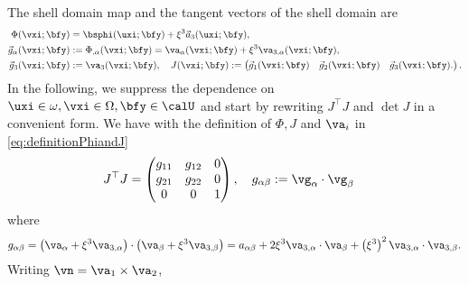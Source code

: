 The shell domain map and the tangent vectors of the shell domain are
 \begin{align}\label{eq:definitionPhiandJ}
     \Phi (\vxi ; \bfy) &= \bsphi(\uxi; \bfy)  + \xi^3 \vec a_3(\uxi; \bfy),\\
     \vec{g}_\alpha (\vxi;\bfy) &:=  \Phi_{,\alpha} (\vxi;\bfy) = \va_{\alpha}(\vxi;\bfy) + \xi^3 \va_{3,\alpha}(\vxi;\bfy),\\
     \vec{g}_3 (\vxi;\bfy) &:= \va_3 (\vxi;\bfy), \quad   J(\vxi;\bfy) :=  \begin{pmatrix}
         \vec{g}_1(\vxi; \bfy) & \vec{g}_2(\vxi; \bfy) & \vec{g}_3(\vxi; \bfy).
     \end{pmatrix}.%
 \end{align}
In the following, we suppress the dependence on $\uxi \in \omega, \vxi \in \Omega, \bfy \in \calU $ and start by rewriting $J^\top J $ and $\det J$ in a convenient form.
We have with the definition of $\Phi,J$ and $\va_i$ in \eqref{eq:definitionPhiandJ}
\begin{align}\label{eq:JJ}
    J^\top J &= \begin{pmatrix}
        g_{11} & g_{12} &  0  \\
         g_{21} & g_{22} & 0  \\
         0 & 0 & 1
    \end{pmatrix},\quad g_{\alpha\beta} := \vg_\alpha \cdot \vg_\beta
\end{align}
where
\begin{align}\label{eq:galphabeta}
    g_{\alpha\beta}= \left( \va_\alpha + \xi^3 \va_{3,\alpha}\right) \cdot \left( \va_\beta + \xi^3 \va_{3,\beta}\right) = a_{\alpha\beta}
    + 2\xi^3 \va_{3,\alpha} \cdot \va_{\beta}
    + \left( \xi^3\right)^2 \va_{3,\alpha} \cdot \va_{3,\beta} .
\end{align}
Writing $ \vn  = \va_1  \times \va_2$,
